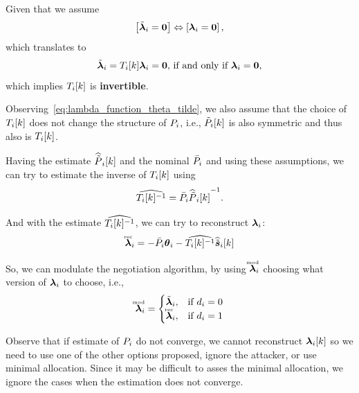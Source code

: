 \documentclass[../main.tex]{subfiles}
\begin{document}
Given that we assume
\begin{equation}
  \left[\tilde{\boldsymbol{\lambda}}_{i}=\mathbf{0} \right] \Leftrightarrow \left[\boldsymbol{\lambda}_{i}=\mathbf{0} \right],
\end{equation}
which translates to
\begin{equation}
  \label{eq:T_is_invertible}
  \tilde{\boldsymbol{\lambda}}_{i}=T_{i}[k]\boldsymbol{\lambda}_{i}=\mathbf{0}\text{, if and only if }\boldsymbol{\lambda}_{i}=\mathbf{0},
\end{equation}
which implies $T_{i}[k]$ is \textbf{invertible}.

Observing~\eqref{eq:lambda_function_theta_tilde}, we also assume that the choice of $T_{i}[k]$ does not change the structure of ${P}_{i}$, i.e., $\tilde{P}_{i}[k]$ is also symmetric and thus also is $T_{i}[k]$.

Having the estimate $\widehat{\tilde{P}}_{i}[k]$ and the nominal $\bar{{P}}_{i}$ and using these assumptions, we can try to estimate the inverse of $T_{i}[k]$ using
\begin{equation}
  \label{eq:estimate_T_inverse}
{\widehat{T_{i}[k]^{-1}}=\bar{{P}}_{i}{\widehat{\tilde{P}}_{i}[k]}^{-1}}.
\end{equation}

And with the estimate $\widehat{T_{i}[k]^{-1}}$, we can try to reconstruct $\boldsymbol{\lambda}_{i}$:
\begin{equation}
  \label{eq:lambdareconstruction}
  \accentset{\text{rec}}{\boldsymbol{\lambda}}_{i}=-\bar{{P}}_{i}\boldsymbol{\theta}_{i}-\widehat{T_{i}[k]^{-1}}\widehat{\tilde{\boldsymbol{s}}}_{i}[k]
\end{equation}

So, we can modulate the negotiation algorithm, by using $\accentset{\text{mod}}{\boldsymbol{\lambda}}_{i}$ choosing what version of $\boldsymbol{\lambda}_{i}$ to choose, i.e.,
\begin{equation}
  \accentset{\text{mod}}{\boldsymbol{\lambda}}_{i}=
          \begin{cases}
            \tilde{\boldsymbol{\lambda}}_{i}, &\text{if } d_{i}=0\\
            \accentset{\text{rec}}{\boldsymbol{\lambda}}_{i}, &\text{if }d_{i}=1\\
        \end{cases}
\end{equation}

\begin{remark}
  Observe that if estimate of ${P}_{i}$ do not converge, we cannot reconstruct $\lambdaik$ so we need to use one of the other options proposed, ignore the attacker, or use minimal allocation.
  Since it may be difficult to asses the minimal allocation, we ignore the cases when the estimation does not converge.
\end{remark}
\end{document}
